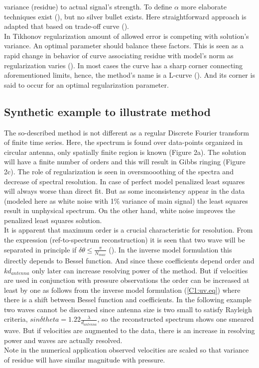 variance (residue) to actual signal's strength. To define $\alpha$ more elaborate techniques exist 
(\cite{williams2001regularization}), but no silver bullet exists. Here straightforward 
approach is adapted that based on trade-off curve (\cite{hansen1993use}).\\
In Tikhonov regularization amount of allowed error is competing with solution's variance. An 
optimal parameter should balance these factors. This is seen as a rapid change in behavior of curve 
associating residue with model's norm as regularization varies (). In most 
cases the curve has a sharp corner connecting aforementioned limits, hence, the method's name is a 
L-curve (\cite{hansen1999curve}). And its corner is said to occur for an optimal regularization 
parameter.\\

\subsection{Synthetic example to illustrate method}
The so-described method is not different as a regular Discrete Fourier transform of finite time 
series. Here, the spectrum is found over data-points organized in circular antenna, only spatially 
finite region is known (Figure 2a). The solution will have a finite number of orders and this will 
result in Gibbs ringing (Figure 2c). The role of regularization is seen in oversmooothing of the 
spectra and decrease of spectral resolution. In case of perfect model penalized least squares will 
always worse than direct fit. But as some inconsistency appear in the data (modeled here as white 
noise with 1\% variance of main signal) the least squares result in unphysical spectrum. On the 
other hand, white noise improves the penalized least squares solution.\\
It is apparent that maximum order is a crucial characteristic for resolution. From the expression 
(ref-to-spectrum reconstruction) it is seen that two wave will be separated in principle if $ 
\delta \theta \leq \frac{\pi}{N_{max}} $ (\cite{rafaely2004plane}). In the inverse model 
formulation this directly depends to Bessel function. And since these coefficients depend order and 
$ k d_{antenna} $ only later can increase resolving power of the method. But if velocities are used 
in conjunction with pressure observations the order can be increased at least by one as follows 
from the inverse model formulation (\ref{C1:uv.eq}) where there is a shift between Bessel function 
and coefficients. In the following example two waves cannot be discerned since antenna size is two 
small to satisfy Rayleigh criteria, $ sin \delta theta = 1.22 \frac{\lambda}{d_{antenna}} $, so the 
reconstructed spectrum shows one smeared wave. But if velocities are augmented to the data, there 
is an increase in resolving power and waves are actually resolved.\\
Note in the numerical application observed velocities are scaled so that variance of 
residue will have similar magnitude with pressure. \\

